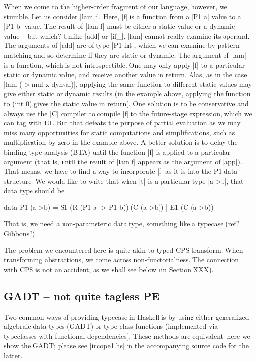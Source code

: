 \documentclass[preprint]{sigplanconf}
\begin{document}
When we come to the higher-order fragment of our language, however, we
stumble. Let us consider |lam f|. Here, |f| is a function from a
|P1 a| value to a |P1 b| value. The result of |lam f| must be either a
static value or a dynamic value -- but which? Unlike |add| or |if_|, 
|lam| cannot really examine its operand. The arguments of |add| are 
of type |P1 int|, which we can examine by pattern-matching and so 
determine if they are static or dynamic. The argument of |lam| is a 
function, which is not introspectible. One may only 
apply |f| to a particular static or dynamic value, and receive another 
value in return. Alas, as in the case |lam (\x -> mul x dynval)|, 
applying the same function to different static values may give 
either static or dynamic results (in the example above, applying 
the function to (int 0) gives the static value in return). One
solution is to be conservative and always use the |C| compiler to
compile |f| to the future-stage expression, which we can tag with
E1. But that defeats the purpose of partial evaluation as we may miss
many opportunities for static computations and simplifications, such
as multiplication by zero in the example above. A better solution is to
delay the binding-type-analysis (BTA) until the function |f| is
applied to a particular argument (that is, until the result of |lam f|
appears as the argument of |app|). That means, we have to find a way
to incorporate |f| as it is into the P1 data structure. We would like
to write that when |t| is a particular type |a->b|, that data type
should be 
\begin{code}
data P1 (a->b) = S1 (R (P1 a -> P1 b)) (C (a->b)) 
               | E1 (C (a->b))
\end{code}
That is, we need a non-parameteric data type, something like a
typecase (ref? Gibbons?).

The problem we encountered here is quite akin to typed CPS
transform. When transforming abstractions, we come across
non-functorialness. The connection with CPS is not an accident, as we
shall see below (in Section XXX).

\subsection{GADT -- not quite tagless PE}
\label{S:PE-GADT}

Two common ways of providing typecase in Haskell is by using either
generalized algebraic data types (GADT) or type-class functions
(implemented via typeclasses with functional dependencies). These
methods are equivalent; here we show the GADT; please see |incope1.hs|
in the accompanying source code for the latter.
\end{document}

